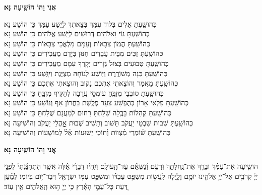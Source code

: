 \documentclass[twoside, openany, parskip=half, 11pt]{book}
\begin{document}

\label{ani vho}
\begin{large}
\textbf{אֲנִי וָהוֹ הוֹשִֽׁיעָה נָּא׃}
\end{large}



\begin{small}
כְּהוֹשַֽׁעְתָּ אֵלִים בְּלוּד עִמָּךְ בְּצֵאתְךָ לְיֵֽשַׁע עַמָּךְ \hfill כֵּן הוֹשַׁע נָא׃ \\
כְּהוֹשַֽׁעְתָּ גּוֹי וֵאלֹהִים דְּרוּשִׁים לְיֵֽשַׁע אֱלֹהִים \hfill כֵּן הוֹשַׁע נָא׃ \\
כְּהוֹשַֽׁעְתָּ הֲמוֹן צְבָאוֹת וְעִמָּם מַלְאֲכֵי צְבָאוֹת \hfill כֵּן הוֹשַׁע נָא׃ \\
כְּהוֹשַֽׁעְתָּ זַכִּים מִבֵּית עֲבָדִים חַנּוּן בְּיָדָם מַעֲבִידִים \hfill כֵּן הוֹשַׁע נָא׃ \\
כְּהוֹשַֽׁעְתָּ טְבוּעִים בְּצוּל גְּזָרִים יְקָרְךָ עִמָּם מַעֲבִירִים \hfill כֵּן הוֹשַׁע נָא׃ \\
כְּהוֹשַֽׁעְתָּ כַּנָּה מְשׁוֹרֶֽרֶת וַיּֽוֹשַׁע לְגוֹחָהּ מְצֻיֶּנֶת וַיִוָּֽשַׁע \hfill כֵּן הוֹשַׁע נָא׃ \\
כְּהוֹשַֽׁעְתָּ מַאֲמַר וְהוֹצֵאתִי אֶתְכֶם נָקוּב וְהוּצֵאתִי אִתְּכֶם \hfill כֵּן הוֹשַׁע נָא׃\\
כְּהוֹשַֽׁעְתָּ סוֹבְבֵי מִזְבֵּֽחַ עוֹמְסֵי עֲרָבָה לְהַקִּיף מִזְבֵּֽחַ \hfill כֵּן הוֹשַׁע נָא׃ \\
כְּהוֹשַֽׁעְתָּ פִּלְאֵי אָרוֹן כְּהֻפְשַׁע צִעֵר פְּלֶֽשֶׁת בַּחֲרוֹן אַף וְנוֹשַׁע \hfill כֵּן הוֹשַׁע נָא׃\\
כְּהוֹשַֽׁעְתָּ קְהִלּוֹת בָּבֶֽלָה שִׁלַּֽחְתָּ רַחוּם לְמַעֲנָם שֻׁלַּחְתָּ \hfill כֵּן הוֹשַׁע נָא׃\\

כְּהוֹשַֽׁעְתָּ שְׁבוּת שִׁבְטֵי יַעֲקֹב תָּשׁוּב וְתָשִׁיב שְׁבוּת אׇׇׇׇׇהֳלֵי יַעֲקֹב \hfill וְהוֹשִׁיעָה נָּא׃\\
כְּהוֹשַֽׁעְתָּ שׁ֗וֹמְרֵי מִ֗צְווֹת וְ֗חוֹכֵי יְשׁוּעוֹת אֵ֗ל֗ לְמוֹשָׁעוֹת \hfill וְהוֹשִׁיעָה נָּא׃

\end{small}

\begin{large}
\textbf{אֲנִי וָהוֹ הוֹשִֽׁיעָה נָּא׃}
\end{large}

הוֹשִׁ֤יעָה אֶת־עַמֶּ֗ךָ וּבָרֵ֥ךְ אֶת־נַֽחֲלָתֶ֑ךָ וּֽרְעֵ֥ם וְ֝נַשְּׂאֵ֗ם עַד־הָֽעוֹלָֽם׃ וְיִֽהְי֨וּ דְבָרַ֜י אֵ֗לֶּה אֲשֶׁ֤ר הִתְחַנַּ֨נְתִּי֙ לִפְנֵ֣י יְיָ֔ קְרֹבִ֛ים אֶל־יְיָ֥ אֱלֹהֵ֖ינוּ יוֹמָ֣ם וָלָ֑יְלָה לַֽעֲשׂ֣וֹת מִשְׁפַּ֣ט עַבְדּ֗וֹ וּמִשְׁפַּ֛ט עַמּ֥וֹ יִשְׂרָאֵ֖ל דְּבַר־י֥וֹם בְּיוֹמֽוֹ׃ לְמַ֗עַן דַּ֚עַת כׇּל־עַמֵּ֣י הָאָ֔רֶץ כִּ֥י יְיָ֖ ה֣וּא הָֽאֱלֹהִ֑ים אֵ֖ין עֽוֹד׃
\end{document}
